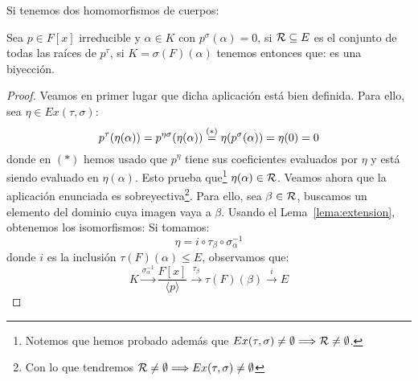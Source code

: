 \begin{prop}[Extensión]
    Si tenemos dos homomorfismos de cuerpos:
    \begin{figure}[H]
        \centering
    \end{figure}
    \noindent
    Sea $p\in F[x]$ irreducible y $\alpha\in K$ con $p^{\sigma}(\alpha)=0$, si $\mathcal{R}\subseteq E$ es el conjunto de todas las raíces de $p^\tau$, si $K = \sigma(F)(\alpha)$ tenemos entonces que:
    es una biyección.
    \begin{proof}
        Veamos en primer lugar que dicha aplicación está bien definida. Para ello, sea $\eta \in Ex(\tau, \sigma)$:
        \begin{equation*}
            p^\tau(\eta(\alpha)) = p^{\eta \sigma}(\eta (\alpha)) \stackrel{(\ast)}{=} \eta(p^\sigma(\alpha)) = \eta(0) = 0
        \end{equation*}
        donde en $(\ast)$ hemos usado que $p^\eta$ tiene sus coeficientes evaluados por $\eta$ y está siendo evaluado en $\eta(\alpha)$. Esto prueba que\footnote{Notemos que hemos probado además que $Ex(\tau,\sigma)\neq \emptyset \Longrightarrow \mathcal{R}\neq \emptyset $.} $\eta(\alpha)\in \mathcal{R}$. Veamos ahora que la aplicación enunciada es sobreyectiva\footnote{Con lo que tendremos $\mathcal{R}\neq \emptyset \Longrightarrow Ex(\tau,\sigma)\neq \emptyset $}. Para ello, sea $\beta\in \mathcal{R}$, buscamos un elemento del dominio cuya imagen vaya a $\beta$. Usando el Lema~\ref{lema:extension}, obtenemos los isomorfismos:
        Si tomamos:
        \begin{equation*}
            \eta = i \circ \tau_\beta \circ \sigma_\alpha^{-1}
        \end{equation*}
        donde $i$ es la inclusión $\tau(F)(\alpha)\leq E$, observamos que:
        \begin{equation*}
            K\stackrel{\sigma_\alpha^{-1}}{\to} \frac{F[x]}{\langle p \rangle } \stackrel{\tau_\beta}{\to} \tau(F)(\beta) \stackrel{i}{\to} E

\end{equation*}
\end{proof}
\end{prop}
